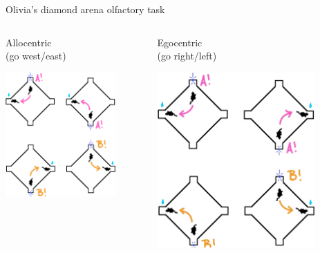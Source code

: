 \documentclass[bigger]{beamer}
\begin{document}
\begin{frame}[label={sec:orgc706323}]{Olivia's diamond arena olfactory task}
\begin{columns}
\begin{column}[t]{0.5\columnwidth}
\center
Allocentric\\
(go west/east)
\begin{center}
\includegraphics[width=0.8\textwidth]{img/allocentric-task.png}
\end{center}
\end{column}

\begin{column}[t]{0.5\columnwidth}
\center
Egocentric\\
(go right/left)
\begin{center}
\includegraphics[width=0.8\textwidth]{img/egocentric-task.png}
\end{center}


\end{column}
\end{columns}
\end{frame}
\end{document}

